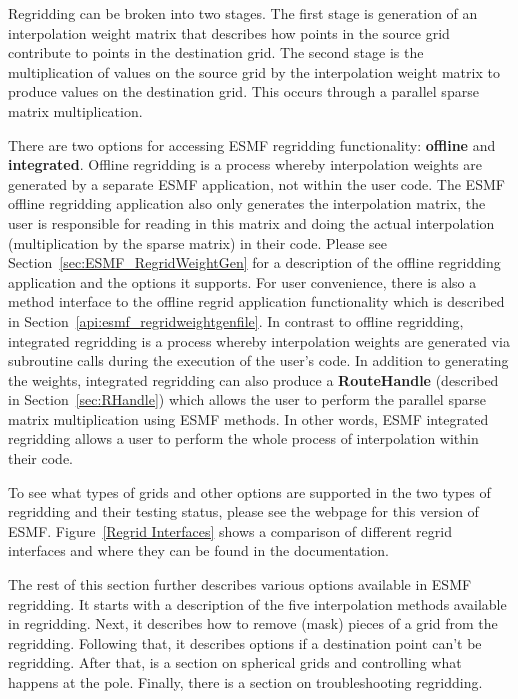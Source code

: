 Regridding can be broken into two stages. The first stage is generation of an interpolation weight matrix that describes how points in 
 the source grid contribute to points in the destination grid. The second stage is the multiplication of values on the source grid by the
 interpolation weight matrix to produce values on the destination grid. This occurs through a parallel sparse matrix multiplication.

 There are two options for accessing ESMF regridding functionality: {\bf offline} and {\bf integrated}. Offline regridding is a process whereby interpolation 
 weights are generated by a separate ESMF application, not within the user code. The ESMF offline regridding application also only generates the interpolation 
 matrix, the user is responsible for reading in this matrix and doing the actual interpolation (multiplication by the sparse matrix) in their code.
 Please see Section~\ref{sec:ESMF_RegridWeightGen} for a description of the offline regridding application and the options it supports. For user convenience, there
 is also a method interface to the offline regrid application functionality which is described in Section~\ref{api:esmf_regridweightgenfile}.
 In contrast to offline regridding, integrated regridding is a process whereby interpolation weights are generated via subroutine calls during the
 execution of the user's code. In addition to generating the weights, integrated regridding can also produce a {\bf RouteHandle} (described in Section~\ref{sec:RHandle}) which allows the user to perform the parallel sparse 
 matrix multiplication using ESMF methods. In other words, ESMF integrated regridding allows a user to perform the whole process of interpolation within their code. 

 To see what types of grids and other options are supported in the two types of regridding and their testing status, please see the  webpage for this version of ESMF.
 Figure~\ref{Regrid Interfaces} shows a comparison of different regrid interfaces and where they can be found in the documentation. 

 The rest of this section further describes various options available in ESMF regridding. It starts with a description of the five interpolation methods available in regridding.
 Next, it describes how to remove (mask) pieces of a grid from the regridding. Following that, it describes options if a destination point can't be regridding. After that, is a section
 on spherical grids and controlling what happens at the pole. Finally, there is a section on troubleshooting regridding.  

